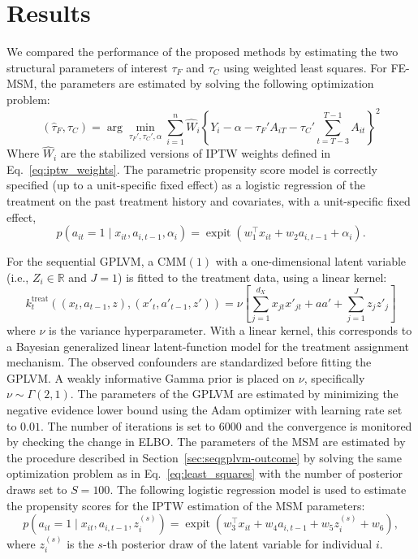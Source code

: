 \section{Results}
\label{results}

We compared the performance of the proposed methods by estimating the two structural 
parameters of interest $\tau_F$ and $\tau_C$ using weighted least squares. 
For FE-MSM, the parameters are estimated by solving the following optimization problem:
\begin{equation}
\label{eq:least_squares}
(\widehat{\tau}_F,\widehat{\tau}_C)
=
\arg\min_{\tau_F',\tau_C',\alpha}
\sum_{i=1}^{n}
\widehat{W}_i
\left\{
Y_i-\alpha-\tau_F' A_{iT}
-\tau_C' \sum_{t=T-3}^{T-1} A_{it}
\right\}^{2}
\end{equation}
Where $\widehat{W}_i$ are the stabilized versions of 
IPTW weights defined in Eq.~\eqref{eq:iptw_weights}. 
The parametric 
propensity score model is correctly specified (up to a unit-specific fixed effect) 
as a logistic regression of the 
treatment on the past treatment history and covariates, with a unit-specific fixed effect, 
\begin{equation}
\label{eq:ps_model}
p(a_{it} = 1 \mid x_{it}, a_{i,t-1}, \alpha_i) = \operatorname{expit}(w_1^\top x_{it} + w_2 a_{i,t-1} + \alpha_i).
\end{equation}


For the sequential GPLVM, a $\text{CMM}(1)$ with a one-dimensional latent variable 
(i.e., $Z_i \in \mathbb{R}$ and $J = 1$) 
is fitted to the treatment data, 
using a linear kernel: 
\[
k_t^{\text{treat}} ((x_t,a_{t-1},z), (x'_t,a'_{t-1},z'))= \nu \left[\sum_{j=1}^{d_X}x_{jt} x'_{jt} 
+ aa' + \sum_{j=1}^{J} z_{j} z'_{j} \right]
\]
where $\nu$ is the variance hyperparameter. With a linear kernel, 
this corresponds to a Bayesian generalized linear latent-function model 
for the treatment assignment mechanism. The observed confounders 
are standardized before fitting the GPLVM. A  
weakly informative Gamma prior is placed on 
$\nu$, specifically $\nu \sim \Gamma(2,1)$.
The parameters of the GPLVM are estimated by minimizing the negative evidence 
lower bound using the Adam optimizer with learning rate set to 
$0.01$. The number of iterations is set to $6000$ and the convergence is 
monitored by checking the change in ELBO.
The parameters of the MSM are estimated by
the procedure described in Section~\ref{sec:seqgplvm-outcome} by solving 
the same optimization problem as in Eq.~\eqref{eq:least_squares} with the 
number of posterior draws set to $S=100$. The following logistic regression 
model is used to estimate the propensity scores for the IPTW estimation 
of the MSM parameters:
\begin{equation}
\label{eq:ps_model_seqgplvm}
p(a_{it} = 1 \mid x_{it}, a_{i,t-1}, z_i^{(s)}) = 
\operatorname{expit}\!\left(w_3^\top x_{it} + w_4 a_{i,t-1}+ w_5 z_i^{(s)}+ w_6 \right),
\end{equation}
where $z_i^{(s)}$ is the $s$-th posterior draw of the latent variable for individual $i$.

